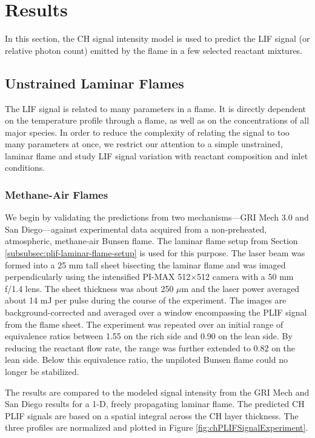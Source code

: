 \section{Results}

In this section, the CH signal intensity model is used to predict the LIF signal (or relative photon count) emitted by the flame in a few selected reactant mixtures.

\subsection{Unstrained Laminar Flames}

The LIF signal is related to many parameters in a flame.
It is directly dependent on the temperature profile through a flame, as well as on the concentrations of all major species.
In order to reduce the complexity of relating the signal to too many parameters at once, we restrict our attention to a simple unstrained, laminar flame and study LIF signal variation with reactant composition and inlet conditions.

\subsubsection{Methane-Air Flames}

We begin by validating the predictions from two mechanisms---GRI Mech 3.0 and San Diego---against experimental data acquired from a non-preheated, atmospheric, methane-air Bunsen flame.
The laminar flame setup from Section \ref{subsubsec:plif-laminar-flame-setup} is used for this purpose.
The laser beam was formed into a 25 mm tall sheet bisecting the laminar flame and was imaged perpendicularly using the intensified PI-MAX 512\(\times\)512 camera with a 50 mm f/1.4 lens.
The sheet thickness was about 250 \(\mu\)m and the laser power averaged about 14 mJ per pulse during the course of the experiment.
The images are background-corrected and averaged over a window encompassing the PLIF signal from the flame sheet.
The experiment was repeated over an initial range of equivalence ratios between 1.55 on the rich side and 0.90 on the lean side.
By reducing the reactant flow rate, the range was further extended to 0.82 on the lean side.
Below this equivalence ratio, the unpiloted Bunsen flame could no longer be stabilized.

The results are compared to the modeled signal intensity from the GRI Mech and San Diego results for a 1-D, freely propagating laminar flame.
The predicted CH PLIF signals are based on a spatial integral across the CH layer thickness.
The three profiles are normalized and plotted in Figure \ref{fig:chPLIFSignalExperiment}.


